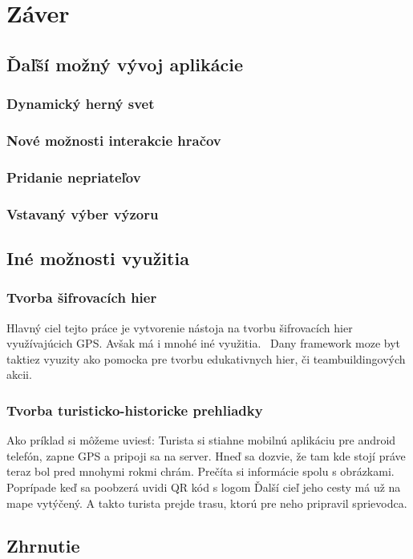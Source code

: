 \chapter{Záver}
\section{Ďaľší možný vývoj aplikácie}
\subsection{Dynamický herný svet}
\subsection{Nové možnosti interakcie hračov}
\subsection{Pridanie nepriateľov}
\subsection{Vstavaný výber výzoru}


\section{Iné možnosti využitia}
\subsection{Tvorba šifrovacích hier}
Hlavný ciel tejto práce je vytvorenie nástoja na tvorbu šifrovacích hier využívajúcich GPS. Avšak má i mnohé iné využitia. \
Dany framework moze byt taktiez vyuzity ako pomocka pre tvorbu edukativnych hier, či teambuildingových akcii. 

\subsection{Tvorba turisticko-historicke prehliadky}
Ako príklad si môžeme uviesť: Turista si stiahne mobilnú aplikáciu pre android telefón, zapne GPS a pripoji sa na server. Hneď sa dozvie, že tam kde stojí práve teraz bol pred mnohymi rokmi chrám. Prečíta si informácie spolu s obrázkami. Poprípade keď sa poobzerá uvidi QR kód s logom Ďalší cieľ jeho cesty má už na mape vytýčený. A takto turista prejde trasu, ktorú pre neho pripravil sprievodca. 

\section{Zhrnutie}